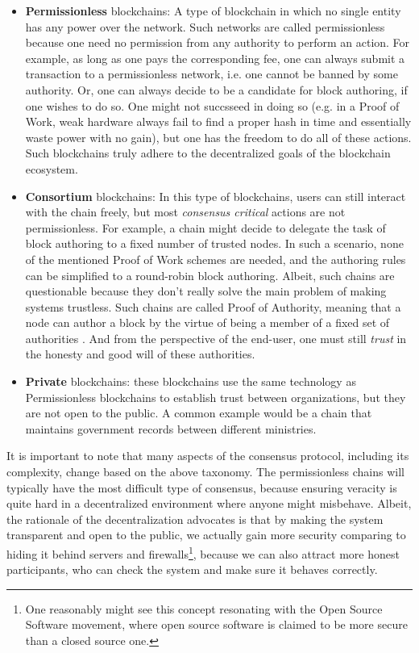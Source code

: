 \begin{itemize}
	\item \textbf{Permissionless} blockchains: A type of blockchain in which no single entity has
	any power over the network. Such networks are called permissionless because one need no permission from any authority to perform an action. For example, as long as one pays the corresponding fee, one can always submit a transaction to a permissionless network, i.e. one cannot be banned by some authority. Or, one can always decide to be a candidate for block
	authoring, if one wishes to do so. One might not succsseed in doing so (e.g. in a Proof of Work, weak hardware always fail to find a proper hash in time and essentially waste power with no gain),
	but one has the freedom to do all of these actions. Such blockchains truly adhere to the
	decentralized goals of the blockchain ecosystem.
	\item \textbf{Consortium} blockchains: In this type of blockchains, users can still interact
	with the chain freely, but most \textit{consensus critical} actions are not permissionless. For
	example, a chain might decide to delegate the task of block authoring to a fixed number of
	trusted nodes. In such a scenario, none of the mentioned Proof of Work schemes are needed, and the authoring rules
	can be simplified to a round-robin block authoring. Albeit, such chains are questionable because
	they don't really solve the main problem of making systems trustless. Such chains are called
	Proof of Authority, meaning that a node can author a block by the virtue of being a member of
	a fixed set of authorities \cite{deangelisPBFTVsProofofauthority2018}. And from the perspective
	of the end-user, one must still \textit{trust} in the honesty and good will of these
	authorities.
	\item \textbf{Private} blockchains: these blockchains use the same technology as Permissionless blockchains to establish trust
	between organizations, but they are not open to the public. A common example would be a chain that
	maintains government records between different ministries.
\end{itemize}

It is important to note that many aspects of the consensus protocol, including its complexity, change
based on the above taxonomy. The permissionless chains will typically have the most difficult type
of consensus, because ensuring veracity is quite hard in a decentralized environment where anyone
might misbehave. Albeit, the rationale of the decentralization advocates is that by making the
system transparent and open to the public, we actually gain more security comparing to hiding it behind
servers and firewalls\footnote{One reasonably might see this concept resonating with the Open Source
Software movement, where open source software is claimed to be more secure than a closed source
one.}, because we can also attract more honest participants, who can check the system and make sure
it behaves correctly.

